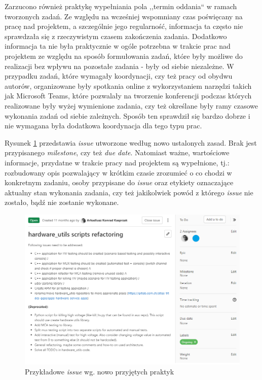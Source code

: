 Zarzucono również praktykę wypełniania pola ,,termin oddania`` w ramach tworzonych zadań. Ze względu na  wcześniej wspomniany czas poświęcany na pracę nad projektem, a szczególnie jego regularność, informacja ta często nie sprawdzała się z rzeczywistym czasem zakończenia zadania. Dodatkowo informacja ta nie była praktycznie w ogóle potrzebna w trakcie prac nad projektem ze względu na sposób formułowania zadań, które były możliwe do realizacji bez wpływu na pozostałe zadania - były od siebie niezależne. W przypadku zadań, które wymagały koordynacji, czy też pracy od obydwu autorów, organizowane były spotkania online z wykorzystaniem narzędzi takich jak Microsoft Teams, które pozwalały na tworzenie konferencji podczas których realizowane były wyżej wymienione zadania, czy też określane były ramy czasowe wykonania zadań od siebie zależnych. Sposób ten sprawdził się bardzo dobrze i nie wymagana była dodatkowa koordynacja dla tego typu prac.

Rysunek \ref{fig:issue} przedstawia \emph{issue} utworzone według nowo ustalonych zasad. Brak jest przypisanego \emph{milestone}, czy też \emph{due date}. Natomiast ważne, wartościowe informacje, przydatne w trakcie pracy nad projektem są wypełnione, tj.: rozbudowany opis pozwalający w krótkim czasie zrozumieć o co chodzi w konkretnym zadaniu, osoby przypisane do \emph{issue} oraz etykiety oznaczające aktualny stan wykonania zadania, czy też jakikolwiek powód z którego \emph{issue} nie zostało, bądź nie zostanie wykonane.

\begin{figure}[H]
    \centering
    \includegraphics[width=\textwidth]{components/practices_res/issue}
    \caption{Przykładowe \emph{issue} wg. nowo przyjętych praktyk}
    \label{fig:issue}
\end{figure}



